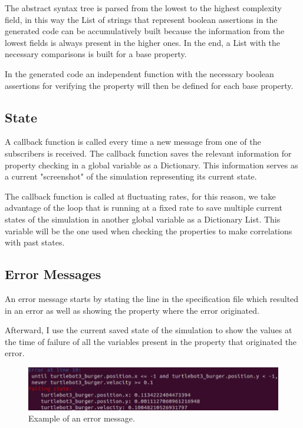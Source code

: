 The abstract syntax tree is parsed from the lowest to the highest complexity field, in this way the List of strings that represent boolean assertions in the generated code can be accumulatively built because the information from the lowest fields is always present in the higher ones. In the end, a List with the necessary comparisons is built for a base property.


In the generated code an independent function with the necessary boolean assertions for verifying the property will then be defined for each base property.


\subsection{State}
\label{ssec:compileState}

A callback function is called every time a new message from one of the subscribers is received. The callback function saves the relevant information for property checking in a global variable as a Dictionary. This information serves as a current "screenshot" of the simulation representing its current state.

The callback function is called at fluctuating rates, for this reason, we take advantage of the loop that is running at a fixed rate to save multiple current states of the simulation in another global variable as a Dictionary List. This variable will be the one used when checking the properties to make correlations with past states.


\subsection{Error Messages}
\label{ssec:errormessages}

An error message starts by stating the line in the specification file which resulted in an error as well as showing the property where the error originated.

Afterward, I use the current saved state of the simulation to show the values at the time of failure of all the variables present in the property that originated the error.

\begin{figure}[htb]
\includegraphics[width=\textwidth]{images/error_message1.png}
\caption{Example of an error message.} \label{fig:monerror}
\end{figure}